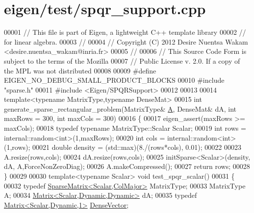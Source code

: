 \hypertarget{eigen_2test_2spqr__support_8cpp_source}{}\section{eigen/test/spqr\+\_\+support.cpp}
\label{eigen_2test_2spqr__support_8cpp_source}

\begin{DoxyCode}
00001 \textcolor{comment}{// This file is part of Eigen, a lightweight C++ template library}
00002 \textcolor{comment}{// for linear algebra.}
00003 \textcolor{comment}{//}
00004 \textcolor{comment}{// Copyright (C) 2012 Desire Nuentsa Wakam <desire.nuentsa\_wakam@inria.fr>}
00005 \textcolor{comment}{//}
00006 \textcolor{comment}{// This Source Code Form is subject to the terms of the Mozilla}
00007 \textcolor{comment}{// Public License v. 2.0. If a copy of the MPL was not distributed}
00008 
00009 \textcolor{preprocessor}{#define EIGEN\_NO\_DEBUG\_SMALL\_PRODUCT\_BLOCKS}
00010 \textcolor{preprocessor}{#include "sparse.h"}
00011 \textcolor{preprocessor}{#include <Eigen/SPQRSupport>}
00012 
00013 
00014 \textcolor{keyword}{template}<\textcolor{keyword}{typename} MatrixType,\textcolor{keyword}{typename} DenseMat>
00015 \textcolor{keywordtype}{int} generate\_sparse\_rectangular\_problem(MatrixType& \hyperlink{group___core___module_class_eigen_1_1_matrix}{A}, DenseMat& dA, \textcolor{keywordtype}{int} maxRows = 300, \textcolor{keywordtype}{int} maxCols = 300)
00016 \{
00017   eigen\_assert(maxRows >= maxCols);
00018   \textcolor{keyword}{typedef} \textcolor{keyword}{typename} MatrixType::Scalar Scalar;
00019   \textcolor{keywordtype}{int} rows = internal::random<int>(1,maxRows);
00020   \textcolor{keywordtype}{int} cols = internal::random<int>(1,rows);
00021   \textcolor{keywordtype}{double} density = (std::max)(8./(rows*cols), 0.01);
00022   
00023   A.resize(rows,cols);
00024   dA.resize(rows,cols);
00025   initSparse<Scalar>(density, dA, A,ForceNonZeroDiag);
00026   A.makeCompressed();
00027   \textcolor{keywordflow}{return} rows;
00028 \}
00029 
00030 \textcolor{keyword}{template}<\textcolor{keyword}{typename} Scalar> \textcolor{keywordtype}{void} test\_spqr\_scalar()
00031 \{
00032   \textcolor{keyword}{typedef} \hyperlink{group___sparse_core___module}{SparseMatrix<Scalar,ColMajor>} MatrixType; 
00033   MatrixType A;
00034   \hyperlink{group___core___module}{Matrix<Scalar,Dynamic,Dynamic>} dA;
00035   \textcolor{keyword}{typedef} \hyperlink{group___core___module}{Matrix<Scalar,Dynamic,1>} \hyperlink{group___core___module}{DenseVector};

\end{DoxyCode}

